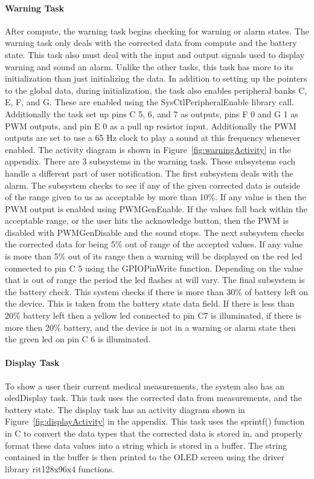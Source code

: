 \documentclass[12pt]{article} %
\begin{document}
    \paragraph{Warning Task}
    After compute, the warning task begins checking for warning or alarm states. The
    warning task only deals with the corrected data from compute and the battery
    state. This task also must deal with the input and output signals used to
    display warning and sound an alarm. Unlike the other tasks, this task has more
    to its initialization than just initializing the data. In addition to setting
    up the pointers to the global data, during initialization, the task also
    enables peripheral banks C, E, F, and G. These are enabled using the
    SysCtlPeripheralEnable library call. Additionally the task set up pins C 5, 6,
    and 7 as outputs, pins F 0 and G 1 as PWM outputs, and pin E 0 as a pull up
    resistor input. Additionally the PWM outputs are set to use a 65 Hz clock to play
    a sound at this frequency whenever enabled. The activity diagram is shown in
    Figure~\ref{fig:warningActivity} in the appendix. There are 3 subsystems in the
    warning task. These subsystems each handle a different part of user
    notification. The first subsystem deals with the alarm. The subsystem checks to
    see if any of the given corrected data is outside of the range given to us as
    acceptable by more than 10\%. If any value is then the PWM output is enabled
    using PWMGenEnable. If the values fall back within the acceptable range, or the
    user hits the acknowledge button, then the PWM is disabled with PWMGenDisable
    and the sound stops. The next subsystem checks the corrected data for being 5\%
    out of range of the accepted values. If any value is more than 5\% out of its
    range then a warning will be displayed on the red led connected to pin C 5
    using the GPIOPinWrite function. Depending on the value that is out of range
    the period the led flashes at will vary. The final subsystem is the battery
    check. This system checks if there is more than 30\% of battery left on the
    device. This is taken from the battery state data field. If there is less than
    20\% battery left then a yellow led connected to pin C7 is illuminated, if
    there is more then 20\% battery, and the device is not in a warning or alarm
    state then the green led on pin C 6 is illuminated. 

    \paragraph{Display Task}
    To show a user their current medical measurements, the system also has an
    oledDisplay task. This task uses the corrected data from measurements, and the
    battery state. The display task has an activity diagram shown in
    Figure~\ref{fig:displayActivity} in the appendix. This task uses the sprintf()
    function in C to convert the data types that the corrected data is stored in,
    and properly format these data values into a string which is stored in a
    buffer. The string contained in the buffer is then printed to the OLED screen
    using the driver library rit128x96x4 functions.
\end{document}
